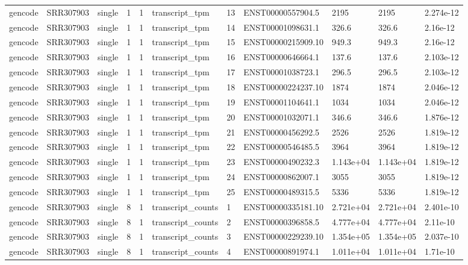 \begin{tabular}{lllllllllll}
gencode & SRR307903 & single & 1 & 1 & transcript\_tpm & 13 & ENST00000557904.5 & 2195 & 2195 & 2.274e-12 \\
gencode & SRR307903 & single & 1 & 1 & transcript\_tpm & 14 & ENST00001098631.1 & 326.6 & 326.6 & 2.16e-12 \\
gencode & SRR307903 & single & 1 & 1 & transcript\_tpm & 15 & ENST00000215909.10 & 949.3 & 949.3 & 2.16e-12 \\
gencode & SRR307903 & single & 1 & 1 & transcript\_tpm & 16 & ENST00000646664.1 & 137.6 & 137.6 & 2.103e-12 \\
gencode & SRR307903 & single & 1 & 1 & transcript\_tpm & 17 & ENST00001038723.1 & 296.5 & 296.5 & 2.103e-12 \\
gencode & SRR307903 & single & 1 & 1 & transcript\_tpm & 18 & ENST00000224237.10 & 1874 & 1874 & 2.046e-12 \\
gencode & SRR307903 & single & 1 & 1 & transcript\_tpm & 19 & ENST00001104641.1 & 1034 & 1034 & 2.046e-12 \\
gencode & SRR307903 & single & 1 & 1 & transcript\_tpm & 20 & ENST00001032071.1 & 346.6 & 346.6 & 1.876e-12 \\
gencode & SRR307903 & single & 1 & 1 & transcript\_tpm & 21 & ENST00000456292.5 & 2526 & 2526 & 1.819e-12 \\
gencode & SRR307903 & single & 1 & 1 & transcript\_tpm & 22 & ENST00000546485.5 & 3964 & 3964 & 1.819e-12 \\
gencode & SRR307903 & single & 1 & 1 & transcript\_tpm & 23 & ENST00000490232.3 & 1.143e+04 & 1.143e+04 & 1.819e-12 \\
gencode & SRR307903 & single & 1 & 1 & transcript\_tpm & 24 & ENST00000862007.1 & 3055 & 3055 & 1.819e-12 \\
gencode & SRR307903 & single & 1 & 1 & transcript\_tpm & 25 & ENST00000489315.5 & 5336 & 5336 & 1.819e-12 \\
gencode & SRR307903 & single & 8 & 1 & transcript\_counts & 1 & ENST00000335181.10 & 2.721e+04 & 2.721e+04 & 2.401e-10 \\
gencode & SRR307903 & single & 8 & 1 & transcript\_counts & 2 & ENST00000396858.5 & 4.777e+04 & 4.777e+04 & 2.11e-10 \\
gencode & SRR307903 & single & 8 & 1 & transcript\_counts & 3 & ENST00000229239.10 & 1.354e+05 & 1.354e+05 & 2.037e-10 \\
gencode & SRR307903 & single & 8 & 1 & transcript\_counts & 4 & ENST00000891974.1 & 1.011e+04 & 1.011e+04 & 1.71e-10 \\

\end{tabular}
